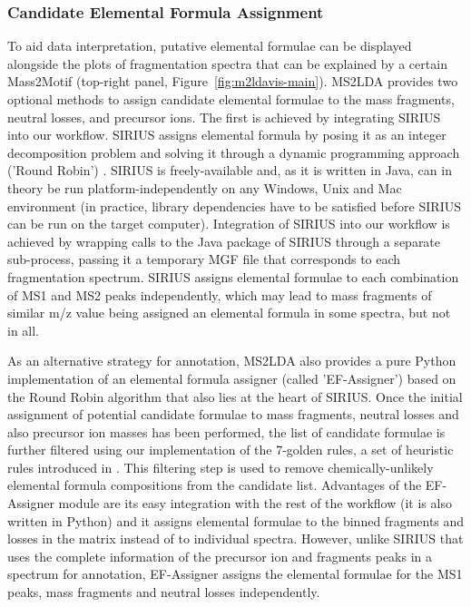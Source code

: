 \subsubsection{Candidate Elemental Formula Assignment}

To aid data interpretation, putative elemental formulae can be displayed alongside the plots of fragmentation spectra that can be explained by a certain Mass2Motif (top-right panel, Figure~\ref{fig:m2ldavis-main}). MS2LDA provides two optional methods to assign candidate elemental formulae to the mass fragments, neutral losses, and precursor ions.  The first is achieved by integrating SIRIUS \cite{Bocker2009} into our workflow. SIRIUS assigns elemental formula by posing it as an integer decomposition problem and solving it through a dynamic programming approach ('Round Robin') \cite{Bocker2007}. SIRIUS is freely-available and, as it is written in Java, can in theory be run platform-independently on any Windows, Unix and Mac environment (in practice, library dependencies have to be satisfied before SIRIUS can be run on the target computer). Integration of SIRIUS into our workflow is achieved by wrapping calls to the Java package of SIRIUS through a separate sub-process, passing it a temporary MGF file that corresponds to each fragmentation spectrum. SIRIUS assigns elemental formulae to each combination of MS1 and MS2 peaks independently, which may lead to mass fragments of similar m/z value being assigned an elemental formula in some spectra, but not in all.

As an alternative strategy for annotation, MS2LDA also provides a pure Python implementation of an elemental formula assigner (called 'EF-Assigner') based on the Round Robin algorithm that also lies at the heart of SIRIUS. Once the initial assignment of potential candidate formulae to mass fragments, neutral losses and also precursor ion masses has been performed, the list of candidate formulae is further filtered using our implementation of the 7-golden rules, a set of heuristic rules introduced in \cite{Kind2007}. This filtering step is used to remove chemically-unlikely elemental formula compositions from the candidate list. Advantages of the EF-Assigner module are its easy integration with the rest of the workflow (it is also written in Python) and it assigns elemental formulae to the binned fragments and losses in the matrix instead of to individual spectra. However, unlike SIRIUS that uses the complete information of the precursor ion and fragments peaks in a spectrum for annotation, EF-Assigner assigns the elemental formulae for the MS1 peaks, mass fragments and neutral losses independently. 

